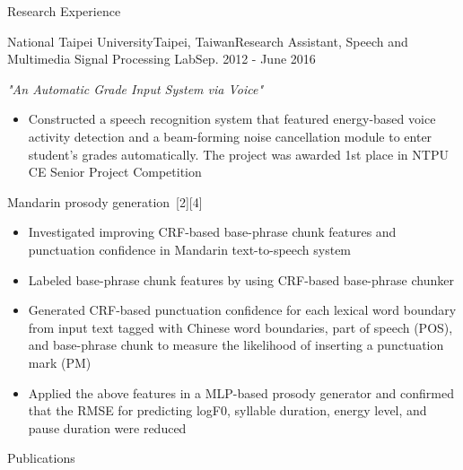 \documentclass{resume} %
\begin{document}
\begin{rSection}{Research Experience}
\begin{rSubsection}{National Taipei University}{Taipei, Taiwan}{Research Assistant, Speech and Multimedia Signal Processing Lab}{Sep. 2012 - June 2016}
        \item {\em "An Automatic Grade Input System via Voice"}
        \begin{itemize}[label=$-$]
            \setlength \itemsep{-0.5em}
            \item Constructed a speech recognition system that featured energy-based voice activity detection and a beam-forming noise cancellation module to enter student’s grades automatically. The project was awarded 1st place in NTPU CE Senior Project Competition
        \end{itemize}\vspace{0.5em}
        \item Mandarin prosody generation~[2][4]
        \begin{itemize}[label=$-$]
            \setlength \itemsep{-0.5em}
            \item Investigated improving CRF-based base-phrase chunk features and punctuation confidence in Mandarin text-to-speech system
            \item Labeled base-phrase chunk features by using CRF-based base-phrase chunker
            \item Generated CRF-based punctuation confidence for each lexical word boundary from input text tagged with Chinese word boundaries, 
                  part of speech (POS), and base-phrase chunk to measure the likelihood of inserting a punctuation mark (PM)
            \item Applied the above features in a MLP-based prosody generator and confirmed that the RMSE for predicting logF0, syllable duration, energy level, and pause duration were reduced
        \end{itemize}\vspace{0.5em}
    \end{rSubsection}
\end{rSection}

\begin{rSection}{Publications}
    
    
    \begin{enumerate}[label={[\arabic*]}]
    \item {}
    \item {}
    \item {}
    \item {}
    \end{enumerate}    
\end{rSection}
\end{document}
